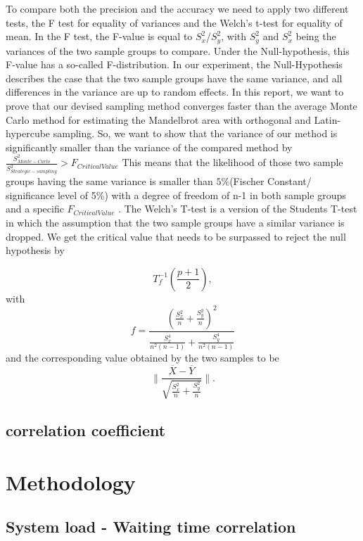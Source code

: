 \documentclass{uva-inf-article}
\begin{document}
To compare both the precision and the accuracy we need to apply two different tests, the F test for equality of variances and the Welch's t-test for equality of mean. In the F test, the F-value is equal to $S_x^2$/$S_y^2$, with $S_y^2$ and $S_x^2$ being the variances of the two sample groups to compare. Under the Null-hypothesis, this F-value has a so-called F-distribution. In our experiment, the Null-Hypothesis 
describes the case that the two sample groups have the same variance, and all differences in the variance are up to random effects.
In this report, we want to prove that our devised sampling method converges faster than the average Monte Carlo method for estimating the Mandelbrot area with orthogonal and Latin-hypercube sampling.
So, we want to show that the variance of our method is significantly smaller than the variance of the compared method by $\frac{S_{Monte-Carlo}^2}{S_{Strategic-sampling}^2}> F_{Critical Value}$ \parencite{Chatfield1980} 
This means that the likelihood of those two sample groups having the same variance is smaller than $5\%$(Fischer Constant/ significance level of 5\%) with a degree of freedom of n-1 in both sample groups and a specific $F_{Critical Value}$ .
The Welch's T-test is a version of the Students T-test in which the assumption that the two sample groups have a
similar variance is dropped. We get the critical value that needs to be surpassed to reject the null hypothesis by

\begin{equation*}
    T_f^{-1}(\frac{p+1}{2}),
\end{equation*}
with
\begin{equation*}
    f = \frac{(\frac{S_x^2}{n}+\frac{S_y^2}{n})^2}{\frac{S_x^4}{n^2(n-1)}+\frac{S_y^4}{n^2(n-1)}}
\end{equation*}
and the corresponding value obtained by the two samples to be
\begin{equation*}
\|\frac{\overline{X}-\overline{Y}}{\sqrt{\frac{S_x^2}{n}+\frac{S_y^2}{n}}}\|.
\end{equation*}


\subsection{correlation coefficient}

\section{Methodology}

\subsection{System load - Waiting time correlation}
\end{document}
